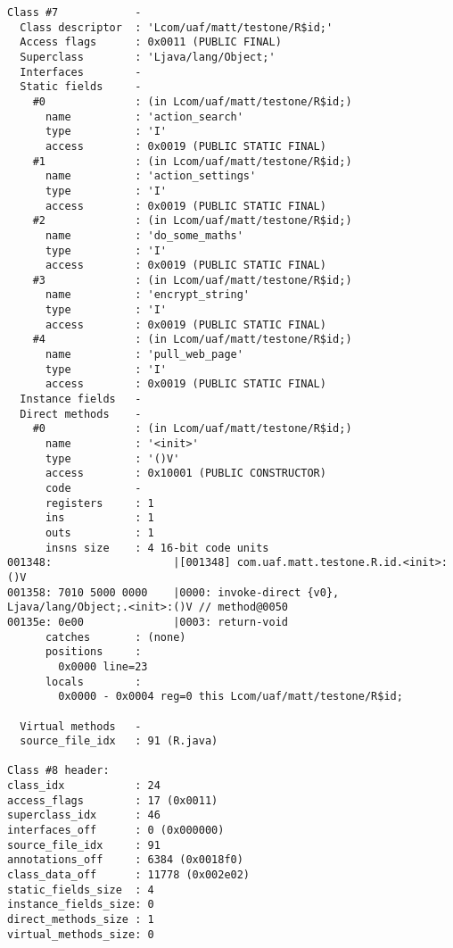 \begin{lstlisting}
Class #7            -
  Class descriptor  : 'Lcom/uaf/matt/testone/R$id;'
  Access flags      : 0x0011 (PUBLIC FINAL)
  Superclass        : 'Ljava/lang/Object;'
  Interfaces        -
  Static fields     -
    #0              : (in Lcom/uaf/matt/testone/R$id;)
      name          : 'action_search'
      type          : 'I'
      access        : 0x0019 (PUBLIC STATIC FINAL)
    #1              : (in Lcom/uaf/matt/testone/R$id;)
      name          : 'action_settings'
      type          : 'I'
      access        : 0x0019 (PUBLIC STATIC FINAL)
    #2              : (in Lcom/uaf/matt/testone/R$id;)
      name          : 'do_some_maths'
      type          : 'I'
      access        : 0x0019 (PUBLIC STATIC FINAL)
    #3              : (in Lcom/uaf/matt/testone/R$id;)
      name          : 'encrypt_string'
      type          : 'I'
      access        : 0x0019 (PUBLIC STATIC FINAL)
    #4              : (in Lcom/uaf/matt/testone/R$id;)
      name          : 'pull_web_page'
      type          : 'I'
      access        : 0x0019 (PUBLIC STATIC FINAL)
  Instance fields   -
  Direct methods    -
    #0              : (in Lcom/uaf/matt/testone/R$id;)
      name          : '<init>'
      type          : '()V'
      access        : 0x10001 (PUBLIC CONSTRUCTOR)
      code          -
      registers     : 1
      ins           : 1
      outs          : 1
      insns size    : 4 16-bit code units
001348:                   |[001348] com.uaf.matt.testone.R.id.<init>:()V
001358: 7010 5000 0000    |0000: invoke-direct {v0}, Ljava/lang/Object;.<init>:()V // method@0050
00135e: 0e00              |0003: return-void
      catches       : (none)
      positions     :
        0x0000 line=23
      locals        :
        0x0000 - 0x0004 reg=0 this Lcom/uaf/matt/testone/R$id;

  Virtual methods   -
  source_file_idx   : 91 (R.java)

Class #8 header:
class_idx           : 24
access_flags        : 17 (0x0011)
superclass_idx      : 46
interfaces_off      : 0 (0x000000)
source_file_idx     : 91
annotations_off     : 6384 (0x0018f0)
class_data_off      : 11778 (0x002e02)
static_fields_size  : 4
instance_fields_size: 0
direct_methods_size : 1
virtual_methods_size: 0


\end{lstlisting}
